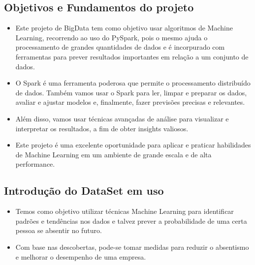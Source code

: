 \documentclass[11pt]{article}
\providecommand{\tightlist}{%
      \setlength{\itemsep}{0pt}\setlength{\parskip}{0pt}}
\begin{document}
    \hypertarget{objetivos-e-fundamentos-do-projeto}{%
\subsection{Objetivos e Fundamentos do
projeto}\label{objetivos-e-fundamentos-do-projeto}}

    \begin{itemize}
\tightlist
\item
 Este projeto de BigData tem como objetivo usar algoritmos de Machine Learning, recorrendo ao uso do PySpark, pois o mesmo ajuda o processamento de grandes quantidades de dados e é incorpurado com ferramentas para prever resultados importantes em relação a um conjunto de dados.
 \item
O Spark é uma ferramenta poderosa que permite o processamento distribuído de dados.
Também vamos usar o Spark para ler, limpar e preparar os dados, avaliar e ajustar modelos e, finalmente, fazer previsões precisas e relevantes.
\item
Além disso, vamos usar técnicas avançadas de análise para visualizar e interpretar os resultados, a fim de obter insights valiosos.
\item
Este projeto é uma excelente oportunidade para aplicar e praticar habilidades de Machine Learning em um ambiente de grande escala e de alta performance.
\end{itemize}

    \hypertarget{introduuxe7uxe3o-do-dataset-em-uso}{%
\subsection{Introdução do DataSet em
uso}\label{introduuxe7uxe3o-do-dataset-em-uso}}

    \begin{itemize}
\tightlist

O nosso conjunto de dados inclui informações como as razões para ausência, gastos de transporte, distância de residência para trabalho, tempo de serviço, carga de trabalho, desempenho, educação, estado pessoal e informações demográficas dos funcionários, bem como a duração do absentismo.
\item
Temos como objetivo utilizar técnicas Machine Learning para identificar padrões e tendências nos dados e talvez prever a probabilidade de uma certa pessoa se absentir no futuro.
\item
Com base nas descobertas, pode-se tomar medidas para reduzir o absentismo e melhorar o desempenho de uma empresa.
\end{itemize}
\newline
\end{document}
